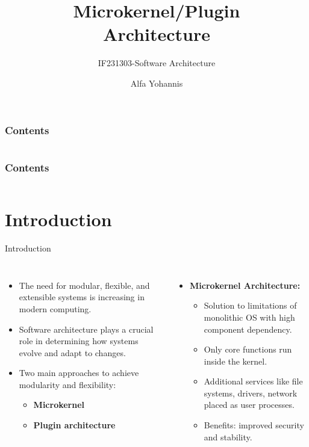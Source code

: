 \documentclass[aspectratio=169, table]{beamer}
\title{\Huge Microkernel/Plugin\\Architecture\\\vspace{10pt}}
\subtitle{IF231303-Software Architecture}
\author{Alfa Yohannis}
\begin{document}
\frame{\titlepage}

\begin{frame}[fragile]
\frametitle{Contents}
\vspace{10pt}
\begin{columns}[t]
\tableofcontents[sections={1-4}]

\tableofcontents[sections={5}]
\end{columns}
\end{frame}

\begin{frame}[fragile]
	\frametitle{Contents}
	\vspace{10pt}
	\begin{columns}[t]
		\tableofcontents[sections={6}]
		
		\tableofcontents[sections={7}]
	\end{columns}
\end{frame}

\section{Introduction}

\begin{frame}{Introduction}
\begin{columns}
\begin{itemize}
	\item The need for modular, flexible, and extensible systems is increasing in modern computing.
	\item Software architecture plays a crucial role in determining how systems evolve and adapt to changes.
	\item Two main approaches to achieve modularity and flexibility:
	\begin{itemize}
		\item \textbf{Microkernel}
		\item \textbf{Plugin architecture}
	\end{itemize}
\end{itemize}

\begin{itemize}
	\item \textbf{Microkernel Architecture:}
	\begin{itemize}
		\item Solution to limitations of monolithic OS with high component dependency.
		\item Only core functions run inside the kernel.
		\item Additional services like file systems, drivers, network placed as user processes.
		\item Benefits: improved security and stability.
	\end{itemize}
\end{itemize}
\end{columns}
\end{frame}
\end{document}

